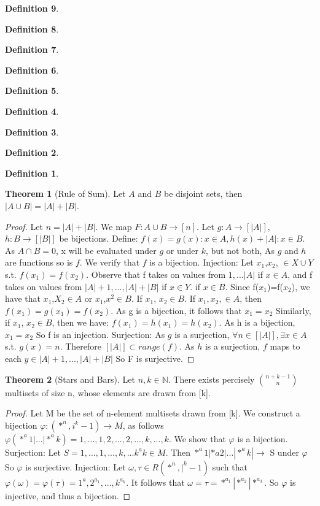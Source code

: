\documentclass{article}
\theoremstyle{definition}
\newtheorem{define}{Definition}[section]
\newtheorem{thm}{Theorem}[section]
\begin{document}
\begin{define}
\begin{define}
\begin{define}
\begin{define}
\begin{define}
\begin{define}
\begin{define}
\begin{define}
\begin{define}
\begin{thm}[Rule of Sum]
Let $A$ and $B$ be disjoint sets, then $|A \cup B|=|A|+|B|$.
\end{thm}
\begin{proof}
Let $n=|A|+|B|$. We map $F: A \cup B \rightarrow [n]$. Let $g: A \rightarrow [|A|]$, $h:B \rightarrow [|B|]$ be bijections. Define: $f(x)={g(x): x \in A, h(x)+|A|:x\in B}$. As $A \cap B=0$, x will be evaluated under $g$ or under $k$, but not both, As $g$ and $h$ are functions so is $f$. We verify that $f$ is a bijection. Injection: Let $x_1$,$x_2$, $\in X\cup Y$ s.t. $f(x_1)=f(x_2)$. Observe that f takes on values from ${1,...|A|}$ if $x \in A$, and f takes on values from ${|A|+1,...,|A|+|B|}$ if $x \in Y$. if $x \in B$. Since f($x_1$)=f($x_2$), we have that $x_1$,$X_2 \in A$ or $x_1$,$x^2 \in B$. If $x_1$, $x_2 \in B$. If $x_1, x_2, \in A$, then $f(x_1)=g(x_1)=f(x_2)$. As g is a bijection, it follows that $x_1=x_2$ Similarly, if $x_1$, $x_2 \in B$, then we have: $f(x_1)=h(x_1)=h(x_2)$. As h is a bijection, $x_1= x_2$ So f is an injection. Surjection: As $g$ is a surjection, $\forall n \in [|A|], \exists x \in A$ s.t. $g(x)=n$. Therefore $[|A|]\subset range(f)$. As $h$ is a surjection, $f$ maps to each $y \in {|A|+1,...,|A|+|B|}$ So F is surjective.
\end{proof}

\begin{thm}[Stars and Bars]
Let $n,k\in \mathbb{N}$. There exists percisely ${n+k-1 \choose n}$ multisets of size n, whose elements are drawn from [k].
\end{thm}
\begin{proof}
Let M be the set of n-element multisets drawn from [k]. We construct a bijection $\varphi:(*^n,i^k-1) \rightarrow M$, as follows $\varphi (*^a1|...|*^ak) = {1,...,1,2,...,2,...,k,...,k}$. We show that $\varphi$ is a bijection. 
Surjection: Let $S = {1,...,1,...,k,...k^ak} \in M$. Then $*^a1|*a2|...|*^ak| \rightarrow$ S under $\varphi$ So $\varphi$ is surjective. Injection: Let $\omega, \tau \in R(*^n,|^k-1)$ such that $\varphi(\omega) =  \varphi(\tau)= {1^a,2^{a_{1}},...,k^{a_{k}}}$. It follows that $\omega = \tau = *^{a_{1}}|*^{a_{2}}|*^{a_{3}}$. So $\varphi$ is injective, and thus a bijection.
\end{proof}


\end{define}
\end{define}
\end{define}
\end{define}
\end{define}
\end{define}
\end{define}
\end{define}
\end{define}
\end{document}

